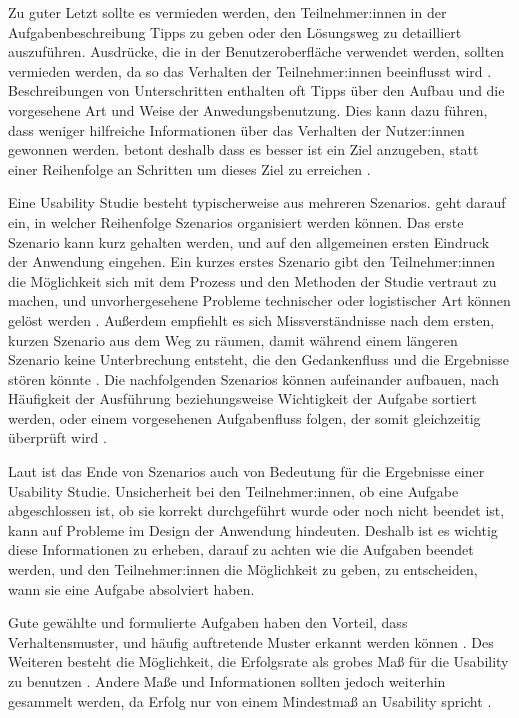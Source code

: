 Zu guter Letzt sollte es vermieden werden, den Teilnehmer:innen in der Aufgabenbeschreibung Tipps zu geben oder den Lösungsweg zu detailliert auszuführen. Ausdrücke, die in der Benutzeroberfläche verwendet werden, sollten vermieden werden, da so das Verhalten der Teilnehmer:innen beeinflusst wird \parencite{mccloskeyTaskScenarios2014, barnumUsabilityTesting2021}. Beschreibungen von Unterschritten enthalten oft Tipps über den Aufbau und die vorgesehene Art und Weise der Anwedungsbenutzung. Dies kann dazu führen, dass weniger hilfreiche Informationen über das Verhalten der Nutzer:innen gewonnen werden. \textcite{barnumUsabilityTesting2021} betont deshalb dass es besser ist ein Ziel anzugeben, statt einer Reihenfolge an Schritten um dieses Ziel zu erreichen \parencite{mccloskeyTaskScenarios2014}.

Eine Usability Studie besteht typischerweise aus mehreren Szenarios. \textcite{barnumUsabilityTesting2021} geht darauf ein, in welcher Reihenfolge Szenarios organisiert werden können. Das erste Szenario kann kurz gehalten werden, und auf den allgemeinen ersten Eindruck der Anwendung eingehen. Ein kurzes erstes Szenario gibt den Teilnehmer:innen die Möglichkeit sich mit dem Prozess und den Methoden der Studie vertraut zu machen, und unvorhergesehene Probleme technischer oder logistischer Art können gelöst werden \parencite{barnumUsabilityTesting2021}. Außerdem empfiehlt es sich Missverständnisse nach dem ersten, kurzen Szenario aus dem Weg zu räumen, damit während einem längeren Szenario keine Unterbrechung entsteht, die den Gedankenfluss und die Ergebnisse stören könnte \parencite{barnumUsabilityTesting2021}. Die nachfolgenden Szenarios können aufeinander aufbauen, nach Häufigkeit der Ausführung beziehungsweise Wichtigkeit der Aufgabe sortiert werden, oder einem vorgesehenen Aufgabenfluss folgen, der somit gleichzeitig überprüft wird \parencite{barnumUsabilityTesting2021}.

Laut \textcite{barnumUsabilityTesting2021} ist das Ende von Szenarios auch von Bedeutung für die Ergebnisse einer Usability Studie. Unsicherheit bei den Teilnehmer:innen, ob eine Aufgabe abgeschlossen ist, ob sie korrekt durchgeführt wurde oder noch nicht beendet ist, kann auf Probleme im Design der Anwendung hindeuten. Deshalb ist es wichtig diese Informationen zu erheben, darauf zu achten wie die Aufgaben beendet werden, und den Teilnehmer:innen die Möglichkeit zu geben, zu entscheiden, wann sie eine Aufgabe absolviert haben.
\parencite{barnumUsabilityTesting2021}

Gute gewählte und formulierte Aufgaben haben den Vorteil, dass Verhaltensmuster, und häufig auftretende Muster erkannt werden können \parencite{barnumUsabilityTesting2021}. Des Weiteren besteht die Möglichkeit, die Erfolgsrate als grobes Maß für die Usability zu benutzen \parencite{nielsenSuccessRate2001}. Andere Maße und Informationen sollten jedoch weiterhin gesammelt werden, da Erfolg nur von einem Mindestmaß an Usability spricht \parencite{nielsenSuccessRate2001}.
